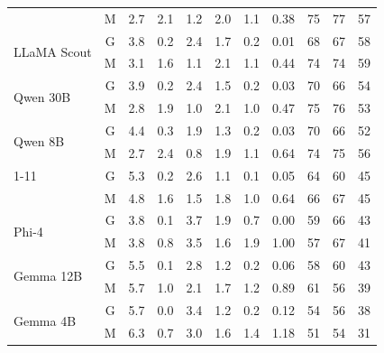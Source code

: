 \begin{table}[H]
\begin{tabular}{@{}l c rrrr r r rrr@{}}
                               & M & 2.7 & 2.1 & 1.2 & 2.0 & 1.1 & 0.38 & 75 & 77 & 57 \\
\multirow{2}{*}{LLaMA Scout}  & G & 3.8 & 0.2 & 2.4 & 1.7 & 0.2 & 0.01 & 68 & 67 & 58 \\
                               & M & 3.1 & 1.6 & 1.1 & 2.1 & 1.1 & 0.44 & 74 & 74 & 59 \\
\multirow{2}{*}{Qwen 30B}     & G & 3.9 & 0.2 & 2.4 & 1.5 & 0.2 & 0.03 & 70 & 66 & 54 \\
                               & M & 2.8 & 1.9 & 1.0 & 2.1 & 1.0 & 0.47 & 75 & 76 & 53 \\
\multirow{2}{*}{Qwen 8B}      & G & 4.4 & 0.3 & 1.9 & 1.3 & 0.2 & 0.03 & 70 & 66 & 52 \\
                               & M & 2.7 & 2.4 & 0.8 & 1.9 & 1.1 & 0.64 & 74 & 75 & 56 \\
\cmidrule(lr){1-11}
\multirow{2}{*}{Gemma 27B}    & G & 5.3 & 0.2 & 2.6 & 1.1 & 0.1 & 0.05 & 64 & 60 & 45 \\
                               & M & 4.8 & 1.6 & 1.5 & 1.8 & 1.0 & 0.64 & 66 & 67 & 45 \\
\multirow{2}{*}{Phi-4}        & G & 3.8 & 0.1 & 3.7 & 1.9 & 0.7 & 0.00 & 59 & 66 & 43 \\
                               & M & 3.8 & 0.8 & 3.5 & 1.6 & 1.9 & 1.00 & 57 & 67 & 41 \\
\multirow{2}{*}{Gemma 12B}    & G & 5.5 & 0.1 & 2.8 & 1.2 & 0.2 & 0.06 & 58 & 60 & 43 \\
                               & M & 5.7 & 1.0 & 2.1 & 1.7 & 1.2 & 0.89 & 61 & 56 & 39 \\
\multirow{2}{*}{Gemma 4B}     & G & 5.7 & 0.0 & 3.4 & 1.2 & 0.2 & 0.12 & 54 & 56 & 38 \\
                               & M & 6.3 & 0.7 & 3.0 & 1.6 & 1.4 & 1.18 & 51 & 54 & 31 \\
\bottomrule
\end{tabular}
\end{table}


